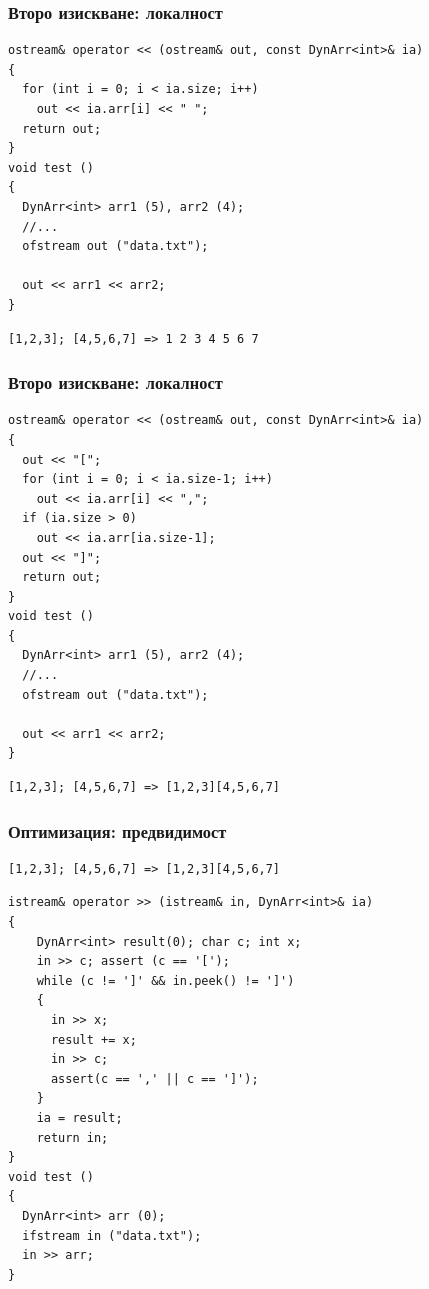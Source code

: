 \documentclass{beamer}
\begin{document}
\begin{frame}[fragile]
\frametitle{Второ изискване: локалност}

\begin{flushleft}
\begin{lstlisting}
ostream& operator << (ostream& out, const DynArr<int>& ia)
{
  for (int i = 0; i < ia.size; i++)
    out << ia.arr[i] << " ";
  return out;
}
void test ()
{
  DynArr<int> arr1 (5), arr2 (4);
  //...
  ofstream out ("data.txt");

  out << arr1 << arr2;
}
\end{lstlisting}  
\end{flushleft}

\begin{lstlisting}
[1,2,3]; [4,5,6,7] => 1 2 3 4 5 6 7
\end{lstlisting}  

\end{frame}


\begin{frame}[fragile]
\frametitle{Второ изискване: локалност}


\begin{flushleft}
\begin{lstlisting}
ostream& operator << (ostream& out, const DynArr<int>& ia)
{
  out << "[";
  for (int i = 0; i < ia.size-1; i++)
    out << ia.arr[i] << ",";
  if (ia.size > 0)
    out << ia.arr[ia.size-1];
  out << "]";
  return out;
}
void test ()
{
  DynArr<int> arr1 (5), arr2 (4);
  //...
  ofstream out ("data.txt");

  out << arr1 << arr2;
}
\end{lstlisting}  
\end{flushleft}

\begin{lstlisting}
[1,2,3]; [4,5,6,7] => [1,2,3][4,5,6,7]
\end{lstlisting}  

\end{frame}



\begin{frame}[fragile]
\frametitle{Оптимизация: предвидимост}

\begin{lstlisting}
[1,2,3]; [4,5,6,7] => [1,2,3][4,5,6,7]
\end{lstlisting}  

\begin{flushleft}
\begin{lstlisting}
istream& operator >> (istream& in, DynArr<int>& ia)
{
    DynArr<int> result(0); char c; int x;
    in >> c; assert (c == '[');
    while (c != ']' && in.peek() != ']')
    {
      in >> x;
      result += x;
      in >> c;
      assert(c == ',' || c == ']');
    }
    ia = result;
    return in;
}
void test ()
{
  DynArr<int> arr (0);
  ifstream in ("data.txt");
  in >> arr;
}
\end{lstlisting}  
\end{flushleft}


\end{frame}
\end{document}
